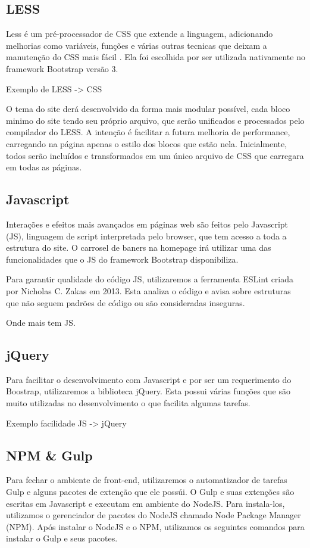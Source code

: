 \documentclass[
	12pt,				%
    oneside,			%
	a4paper,			%
	english,			%
	french,				%
	spanish,			%
	brazil				%
	]{abntex2}
\begin{document}
\subsection{LESS}
Less é um pré-processador de CSS que extende a linguagem, adicionando melhorias como variáveis, funções e várias outras tecnicas que deixam a manutenção do CSS mais fácil \cite{Less}. Ela foi escolhida por ser utilizada nativamente no framework Bootstrap versão 3.

\TODO Exemplo de LESS -> CSS

O tema do site derá desenvolvido da forma mais modular possível, cada bloco minimo do site tendo seu próprio arquivo, que serão unificados e processados pelo compilador do LESS. A intenção é facilitar a futura melhoria de performance, carregando na página apenas o estilo dos blocos que estão nela. Inicialmente, todos serão incluídos e transformados em um único arquivo de CSS que carregara em todas as páginas.

\subsection{Javascript}
Interações e efeitos mais avançados em páginas web são feitos pelo Javascript (JS), linguagem de script interpretada pelo browser, que tem acesso a toda a estrutura do site. O carrosel de baners na homepage irá utilizar uma das funcionalidades que o JS do framework Bootstrap disponibiliza.

Para garantir qualidade do código JS, utilizaremos a ferramenta ESLint criada por Nicholas C. Zakas em 2013. Esta analiza o código e avisa sobre estruturas que não seguem  padrões de código ou são consideradas inseguras.

\TODO Onde mais tem JS.
\subsection{jQuery}
Para facilitar o desenvolvimento com Javascript e por ser um requerimento do Boostrap, utilizaremos a biblioteca jQuery. Esta possui várias funções que são muito utilizadas no desenvolvimento o que facilita algumas tarefas.

\TODO Exemplo facilidade JS -> jQuery

\subsection{NPM & Gulp}
Para fechar o ambiente de front-end, utilizaremos o automatizador de tarefas Gulp e alguns pacotes de extenção que ele possúi. O Gulp e suas extenções são escritas em Javascript e executam em ambiente do NodeJS. Para instala-los, utilizamos o gerenciador de pacotes do NodeJS chamado Node Package Manager (NPM). Após instalar o NodeJS e o NPM, utilizamos os seguintes comandos para instalar o Gulp e seus pacotes.
\end{document}
